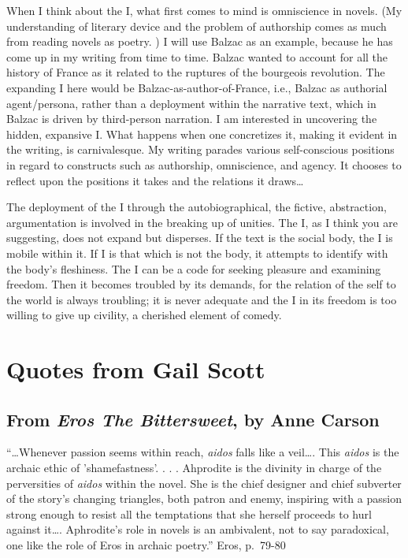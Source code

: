 \documentclass[
]{memoir}
\begin{document}
When I think about the I, what first comes to mind is omniscience in
novels. (My understanding of literary device and the problem of
authorship comes as much from reading novels as poetry. ) I will use
Balzac as an example, because he has come up in my writing from time to
time. Balzac wanted to account for all the history of France as it
related to the ruptures of the bourgeois revolution. The expanding I
here would be Balzac-as-author-of-France, i.e., Balzac as authorial
agent/persona, rather than a deployment within the narrative text, which
in Balzac is driven by third-person narration. I am interested in
uncovering the hidden, expansive I. What happens when one concretizes
it, making it evident in the writing, is carnivalesque. My writing
parades various self-conscious positions in regard to constructs such as
authorship, omniscience, and agency. It chooses to reflect upon the
positions it takes and the relations it draws\ldots{}

The deployment of the I through the autobiographical, the fictive,
abstraction, argumentation is involved in the breaking up of unities.
The I, as I think you are suggesting, does not expand but disperses. If
the text is the social body, the I is mobile within it. If I is that
which is not the body, it attempts to identify with the body's
fleshiness. The I can be a code for seeking pleasure and examining
freedom. Then it becomes troubled by its demands, for the relation of
the self to the world is always troubling; it is never adequate and the
I in its freedom is too willing to give up civility, a cherished element
of comedy.

\hypertarget{quotes-from-gail-scott}{%
\section*{Quotes from Gail Scott}\label{quotes-from-gail-scott}}

\hypertarget{from-eros-the-bittersweet-by-anne-carson}{%
\subsection*{\texorpdfstring{From \emph{Eros The Bittersweet}, by Anne
Carson}{From Eros The Bittersweet, by Anne Carson}}\label{from-eros-the-bittersweet-by-anne-carson}}

``\ldots{}Whenever passion seems within reach, \emph{aidos} falls like a
veil\ldots{}. This \emph{aidos} is the archaic ethic of 'shamefastness'.
. . . Ahprodite is the divinity in charge of the perversities of
\emph{aidos} within the novel. She is the chief designer and chief
subverter of the story's changing triangles, both patron and enemy,
inspiring with a passion strong enough to resist all the temptations
that she herself proceeds to hurl against it\ldots{}. Aphrodite's role
in novels is an ambivalent, not to say paradoxical, one like the role of
Eros in archaic poetry.'' Eros, p.~79-80
\end{document}
